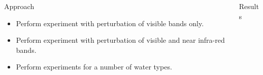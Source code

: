 \documentclass[final]{beamer}
\newlength{\sepwid}
\newlength{\onecolwid}
\newlength{\twocolwid}
\begin{document}
\begin{frame}[t]
\begin{columns}[t]
\begin{column}{\onecolwid}
\begin{block}{Approach}
\begin{itemize}
\item Perform experiment with perturbation of visible bands only.
\item Perform experiment with perturbation of visible and near infra-red bands.
\item Perform experiments for a number of water types.
\end{itemize}
\end{block}



\end{column} %


\begin{column}{\twocolwid} %
\begin{block}{Results}

\begin{columns}[t,totalwidth=\twocolwid] %
\begin{column}{\onecolwid}\vspace{-.6in} 


\end{column}
\end{columns}
\end{block}
\end{column}
\end{columns}
\end{frame}
\end{document}
